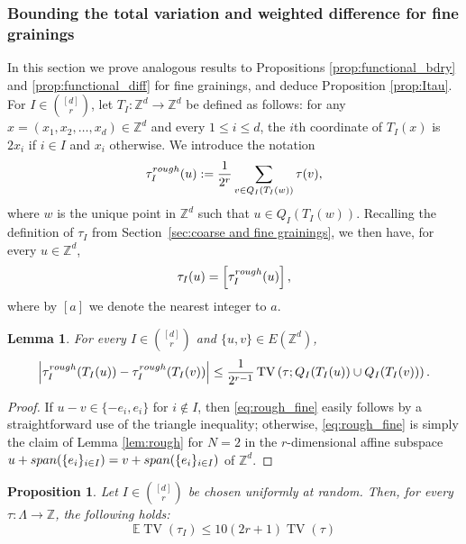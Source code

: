 \documentclass[11pt, reqno]{amsart}
\newtheorem{lemma}[theorem]{Lemma}
\newtheorem{proposition}[theorem]{Proposition}
\newcommand{\Z}{\mathbb{Z}}
\DeclareMathOperator{\TV}{TV}
\numberwithin{equation}{section}
\begin{document}
\subsubsection{Bounding the total variation and weighted difference for fine grainings}
\label{subsubsec:bounds_fine}

In this section we prove analogous results to Propositions \ref{prop:functional_bdry} and \ref{prop:functional_diff} for fine grainings, and deduce Proposition \ref{prop:Itau}.
For $I\in\binom{[d]}{r}$, let $T_I\colon {\mathbb Z}^d\to{\mathbb Z}^d$ be defined as follows: for any $x=(x_1,x_2,\ldots,x_d)\in{\mathbb Z}^d$ and every $1\leq i\leq d$, the $i$th coordinate of $T_I(x)$ is $2x_i$ if $i\in I$ and $x_i$ otherwise.
We introduce the notation
$$\tau^{\rm rough}_I (u):=
\frac{1}{2^r}\sum_{v\in Q_I(T_I(w))}
\tau(v),
$$
where $w$ is the unique point in ${\mathbb Z}^d$ such that $u\in Q_I(T_I(w))$. 
Recalling the definition of $\tau_I$ from Section~\ref{sec:coarse and fine grainings}, we then have, for every $u\in{\mathbb Z}^d$,
$$
\tau_I (u)= 
\left[ \tau^{\rm rough}_I (u)\right],
$$
where by $\left[ a \right]$ we denote the nearest integer to $a$.

\begin{lemma}\label{lem:rough_fine}
For every $I\in\binom{[d]}{r}$ and $\{u,v\}\in E(\Z^d)$, 
\begin{equation}\label{eq:rough_fine}
\left\lvert\tau^{\rm rough}_I(T_I(u))-\tau^{\rm rough}_I(T_I(v))\right\rvert
\leq\frac{1}{2^{r-1}}\TV\left(\tau; Q_I(T_I(u))\cup Q_I(T_I(v))\right).
\end{equation}
\end{lemma}
\begin{proof}
If $u-v\in\{-e_i,e_i\}$ for $i\notin I$, then \eqref{eq:rough_fine} easily follows by a straightforward use of the triangle inequality; otherwise, \eqref{eq:rough_fine} is simply the claim of Lemma \ref{lem:rough} for $N=2$ in the $r$-dimensional affine subspace $u+{\rm span}(\{e_i\}_{i\in I})=v+{\rm span}(\{e_i\}_{i\in I})$ of ${\mathbb Z}^d$.
\end{proof}

\begin{proposition}\label{prop:functional_bdry_fine}
Let $I\in\binom{[d]}{r}$ be chosen uniformly at random. Then, for every $\tau\colon \Lambda \to \Z$, the following holds:
$$
\mathbb{E} \TV(\tau_I) \leq 10(2r+1)\TV(\tau) 
$$
\end{proposition}
\end{document}
